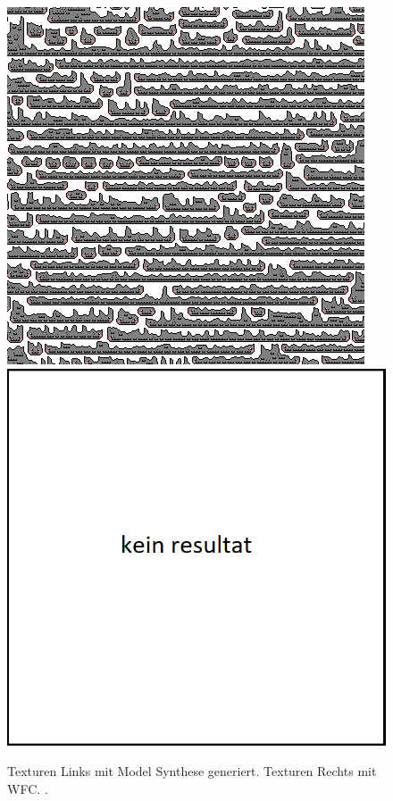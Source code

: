 \documentclass[12pt, a4paper,twoside,openany]{report} %
\begin{document}
\begin{figure}[H]
    \vspace{1em}
    \includegraphics[width=0.45\linewidth]{images/wfc-model-comparison/cat-model.png}%
    \qquad
    \includegraphics[width=0.45\linewidth]{images/wfc-model-comparison/kein-resultat.png}%
    \caption{Texturen Links mit Model Synthese generiert. Texturen Rechts mit WFC. \cite[S.13]{merrell2018compare}.}%
\end{figure}
\end{document}

